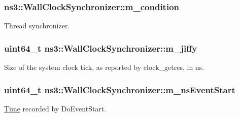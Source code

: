 \subsubsection[{\texorpdfstring{m\+\_\+condition}{m_condition}}]{ ns3\+::\+Wall\+Clock\+Synchronizer\+::m\+\_\+condition\hspace{0.3cm}{\ttfamily [protected]}}\hypertarget{classns3_1_1WallClockSynchronizer_a759454003565834a88fa197887652b65}{}\label{classns3_1_1WallClockSynchronizer_a759454003565834a88fa197887652b65}
Thread synchronizer. 
\subsubsection[{\texorpdfstring{m\+\_\+jiffy}{m_jiffy}}]{\setlength{\rightskip}{0pt plus 5cm}uint64\+\_\+t ns3\+::\+Wall\+Clock\+Synchronizer\+::m\+\_\+jiffy\hspace{0.3cm}{\ttfamily [protected]}}\hypertarget{classns3_1_1WallClockSynchronizer_a2bf669a1ab0a9238dc67ad692b2dfc61}{}\label{classns3_1_1WallClockSynchronizer_a2bf669a1ab0a9238dc67ad692b2dfc61}
Size of the system clock tick, as reported by {\ttfamily clock\+\_\+getres}, in ns. 
\subsubsection[{\texorpdfstring{m\+\_\+ns\+Event\+Start}{m_nsEventStart}}]{\setlength{\rightskip}{0pt plus 5cm}uint64\+\_\+t ns3\+::\+Wall\+Clock\+Synchronizer\+::m\+\_\+ns\+Event\+Start\hspace{0.3cm}{\ttfamily [protected]}}\hypertarget{classns3_1_1WallClockSynchronizer_a9fff0bee75a2317a2369794698f2a78a}{}\label{classns3_1_1WallClockSynchronizer_a9fff0bee75a2317a2369794698f2a78a}
\hyperlink{classns3_1_1Time}{Time} recorded by Do\+Event\+Start. 
